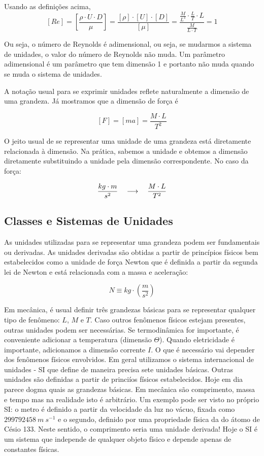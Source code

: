 Usando as definições acima,
\[
  [Re] = \left[ \frac{\rho \cdot U \cdot D}{\mu} \right] = \frac{[\rho]\cdot[U]\cdot [D]}{[\mu]} = \frac{\frac{M}{L^3}\cdot\frac{L}{T}\cdot L}{\frac{M}{L\cdot T}} = 1
\]

Ou seja, o número de Reynolds é adimensional, ou seja, se mudarmos a sistema de unidades, o valor do número de Reynolds não muda. Um parâmetro adimensional é um parâmetro que tem dimensão 1 e portanto não muda quando se muda o sistema de unidades.

A notação usual para se exprimir unidades reflete naturalmente a dimensão de uma grandeza. Já mostramos que a dimensão de força é

\[
  [F] = [ma] = \frac{M\cdot L}{T^2}
\]
  
O jeito usual de se representar uma unidade de uma grandeza está diretamente relacionada à dimensão. Na prática, sabemos a unidade e obtemos a dimensão diretamente substituindo a unidade pela dimensão correspondente. No caso da força:

\[
\frac{kg\cdot m}{s^2} \quad\longrightarrow\quad \frac{M\cdot L}{T^2}
\]
    
  
\subsection{Classes e Sistemas de Unidades}

As unidades utilizadas para se representar uma grandeza podem ser fundamentais ou derivadas. As unidades derivadas são obtidas a partir de princípios físicos bem estabelecidos como a unidade de força Newton que é definida a partir da segunda lei de Newton e está relacionada com a massa e aceleração:

\[
N \equiv kg \cdot\left(\frac{m}{s^2}\right)
\]

Em mecânica, é usual definir três grandezas básicas para se representar qualquer tipo de fenômeno: $L$, $M$ e $T$. Caso outros fenômenos físicos estejam presentes, outras unidades podem ser necessárias. Se termodinâmica for importante, é conveniente adicionar a temperatura (dimensão $\Theta$). Quando eletricidade é importante, adicionamos a dimensão corrente $I$. O que é necessário vai depender dos fenômenos físicos envolvidos. Em geral utilizamos o sistema internacional de unidades \cite{BIPM19}  - SI que define de maneira precisa sete unidades básicas. Outras unidades são definidas a partir de princiíos físicos estabelecidos. Hoje em dia parece dogma quais as grandezas básicas. Em mecânica são comprimento, massa e tempo mas na realidade isto é arbitrário. Um exemplo pode ser visto no próprio SI: o metro é definido a partir da velocidade da luz no vácuo, fixada como $299 792 458 \: m\:s^{-1}$ e o segundo, definido por uma propriedade física da do átomo de Césio 133. Neste sentido, o comprimento seria uma unidade derivada! Hoje o SI é um sistema que independe de qualquer objeto físico e depende apenas de constantes físicas.

